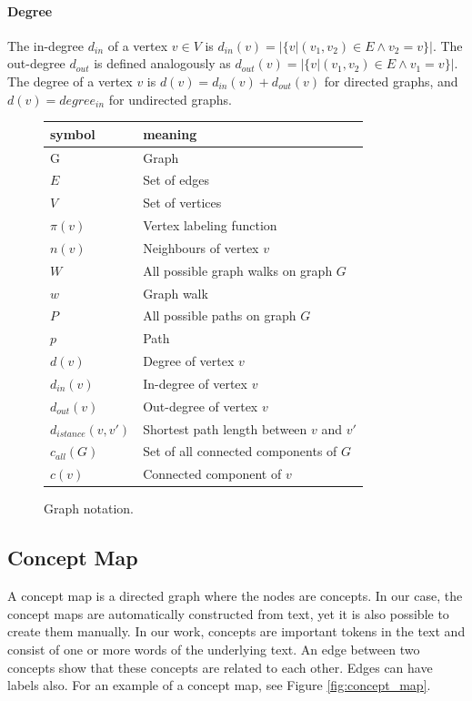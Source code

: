 \paragraph{Degree}
The in-degree $d_{in}$ of a vertex $v \in V$ is $d_{in}(v) = |\{v | (v_1, v_2) \in E \land v_2 = v\}|$.
The out-degree $d_{out}$ is defined analogously as $d_{out}(v) = |\{v | (v_1, v_2) \in E \land v_1 = v\}|$.
The degree of a vertex $v$ is $d(v) = d_{in}(v) + d_{out}(v)$ for directed graphs, and $d(v) = degree_{in}$ for undirected graphs.

\begin{figure}[htb!]
\centering
\begin{tabular}{ll}
symbol &  meaning \\
\midrule
G & Graph \\
$E$ & Set of edges \\
$V$ & Set of vertices \\
$\pi(v)$ & Vertex labeling function \\
$n(v)$ & Neighbours of vertex $v$ \\
$W$ & All possible graph walks on graph $G$ \\
$w$ & Graph walk \\
$P$ & All possible paths on graph $G$ \\
$p$ & Path \\
$d(v)$ & Degree of vertex $v$ \\
$d_{in}(v)$ & In-degree of vertex $v$ \\
$d_{out}(v)$ & Out-degree of vertex $v$ \\
$d_{istance}(v, v')$ & Shortest path length between $v$ and $v'$ \\
$c_{all}(G)$ & Set of all connected components of $G$ \\
$c(v)$ & Connected component of $v$ \\
\end{tabular}
\caption[Notation: Graphs]{Graph notation.}
\end{figure}

\subsection{Concept Map}
A concept map is a directed graph where the nodes are concepts. In our case, the concept maps are automatically constructed from text, yet it is also possible to create them manually.
In our work, concepts are important tokens in the text and consist of one or more words of the underlying text.
An edge between two concepts show that these concepts are related to each other. Edges can have labels also.
For an example of a concept map, see Figure \ref{fig:concept_map}.

